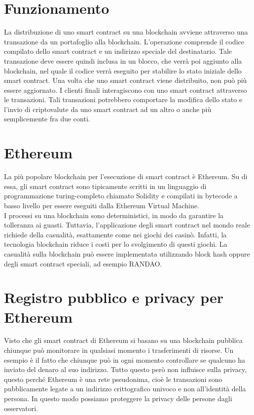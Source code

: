 \documentclass[a4paper,11pt]{report}
\begin{document}
\section{Funzionamento}
La distribuzione di uno smart contract su una blockchain avviene attraverso una transazione da un portafoglio alla blockchain. L'operazione comprende il codice compilato dello smart contract e un indirizzo speciale del destinatario. Tale transazione deve essere quindi inclusa in un blocco, che verrà poi aggiunto alla blockchain, nel quale il codice verrà eseguito per stabilire lo stato iniziale dello smart contract. Una volta che uno smart contract viene distribuito, non può più essere aggiornato. I clienti finali interagiscono con uno smart contract attraverso le transazioni. Tali transazioni potrebbero comportare la modifica dello stato e l'invio di criptovalute da uno smart contract ad un altro o anche più semplicemente fra due conti.

\section{Ethereum}
La più popolare blockchain per l'esecuzione di smart contract è Ethereum. Su di essa, gli smart contract sono tipicamente scritti in un linguaggio di programmazione turing-completo chiamato Solidity e compilati in bytecode a basso livello per essere eseguiti dalla Ethereum Virtual Machine.\\
I processi su una blockchain sono deterministici, in modo da garantire la tolleranza ai guasti. Tuttavia, l'applicazione degli smart contract nel mondo reale richiede della casualità, esattamente come nei giochi dei casinò. Infatti, la tecnologia blockchain riduce i costi per lo svolgimento di questi giochi. La casualità sulla blockchain può essere implementata utilizzando block hash oppure degli smart contract speciali, ad esempio RANDAO.

\section{Registro pubblico e privacy per Ethereum}
Visto che gli smart contract di Ethereum si basano su una blockchain pubblica chiunque può monitorare in qualsiasi momento i trasferimenti di risorse. Un esempio è il fatto che chiunque può in ogni momento controllare se qualcuno ha inviato del denaro al suo indirizzo. Tutto questo però non influisce sulla privacy, questo perché Ethereum è una rete pseudonima, cioè le transazioni sono pubblicamente legate a un indirizzo crittografico univoco e non all'identità della persona. In questo modo possiamo proteggere la privacy delle persone dagli osservatori.
\end{document}
